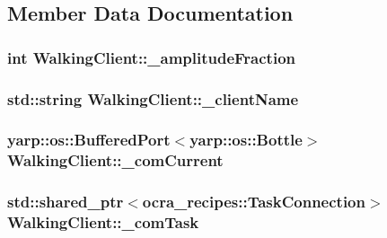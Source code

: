 \subsection{\-Member \-Data \-Documentation}
\hypertarget{classWalkingClient_ac548ce03ea9ceffb4b42981942f66dd0}{
\subsubsection[{\-\_\-amplitude\-Fraction}]{\setlength{\rightskip}{0pt plus 5cm}int {\bf \-Walking\-Client\-::\-\_\-amplitude\-Fraction}}}\label{classWalkingClient_ac548ce03ea9ceffb4b42981942f66dd0}
\hypertarget{classWalkingClient_aff02b341d5e1f500dc9a849337319a8d}{
\subsubsection[{\-\_\-client\-Name}]{\setlength{\rightskip}{0pt plus 5cm}std\-::string {\bf \-Walking\-Client\-::\-\_\-client\-Name}}}\label{classWalkingClient_aff02b341d5e1f500dc9a849337319a8d}
\hypertarget{classWalkingClient_a199a104e0d4d52deae07d88d8229b60d}{
\subsubsection[{\-\_\-com\-Current}]{\setlength{\rightskip}{0pt plus 5cm}yarp\-::os\-::\-Buffered\-Port$<$yarp\-::os\-::\-Bottle$>$ {\bf \-Walking\-Client\-::\-\_\-com\-Current}}}\label{classWalkingClient_a199a104e0d4d52deae07d88d8229b60d}
\hypertarget{classWalkingClient_aa798d6193535e80816f8107ee5fb2172}{
\subsubsection[{\-\_\-com\-Task}]{\setlength{\rightskip}{0pt plus 5cm}std\-::shared\-\_\-ptr$<$ocra\-\_\-recipes\-::\-Task\-Connection$>$ {\bf \-Walking\-Client\-::\-\_\-com\-Task}}}\label{classWalkingClient_aa798d6193535e80816f8107ee5fb2172}

